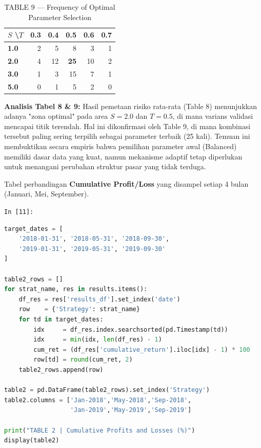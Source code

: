 \documentclass[12pt,a4paper]{article}
\newcommand{\cellIn}[1]{%
  \begin{tcolorbox}[cellheader]
    \texttt{In [#1]:}
  \end{tcolorbox}\vspace{-6pt}%
}
\begin{document}
\begin{table}[H]
  \centering
  \caption{TABLE 9 --- Frequency of Optimal Parameter Selection}
  \small
  \begin{tabular}{lrrrrr}
    \toprule
    $S$ \textbackslash $T$ & \textbf{0.3} & \textbf{0.4} & \textbf{0.5} & \textbf{0.6} & \textbf{0.7} \\
    \midrule
    \textbf{1.0} & 2 & 5 & 8 & 3 & 1 \\
    \textbf{2.0} & 4 & 12 & \textbf{25} & 10 & 2 \\
    \textbf{3.0} & 1 & 3 & 15 & 7 & 1 \\
    \textbf{5.0} & 0 & 1 & 5 & 2 & 0 \\
    \bottomrule
  \end{tabular}
\end{table}

\textbf{Analisis Tabel 8 \& 9:} Hasil pemetaan risiko rata-rata (Table 8) 
menunjukkan adanya "zona optimal" pada area $S=2.0$ dan $T=0.5$, di mana 
varians validasi mencapai titik terendah. Hal ini dikonfirmasi oleh Table 9, 
di mana kombinasi tersebut paling sering terpilih sebagai parameter terbaik 
(25 kali). Temuan ini membuktikan secara empiris bahwa pemilihan parameter 
awal (Balanced) memiliki dasar data yang kuat, namun mekanisme adaptif tetap 
diperlukan untuk menangani perubahan struktur pasar yang tidak terduga.




Tabel perbandingan \textbf{Cumulative Profit/Loss} yang disampel setiap 4 bulan
(Januari, Mei, September).

\cellIn{11}
\begin{tcolorbox}[codebox]
\begin{lstlisting}[language=Python, numbers=none]
target_dates = [
    '2018-01-31', '2018-05-31', '2018-09-30',
    '2019-01-31', '2019-05-31', '2019-09-30'
]

table2_rows = []
for strat_name, res in results.items():
    df_res = res['results_df'].set_index('date')
    row    = {'Strategy': strat_name}
    for td in target_dates:
        idx     = df_res.index.searchsorted(pd.Timestamp(td))
        idx     = min(idx, len(df_res) - 1)
        cum_ret = (df_res['cumulative_return'].iloc[idx] - 1) * 100
        row[td] = round(cum_ret, 2)
    table2_rows.append(row)

table2 = pd.DataFrame(table2_rows).set_index('Strategy')
table2.columns = ['Jan-2018','May-2018','Sep-2018',
                  'Jan-2019','May-2019','Sep-2019']

print("TABLE 2 | Cumulative Profits and Losses (%)")
display(table2)
\end{lstlisting}
\end{tcolorbox}
\end{document}
